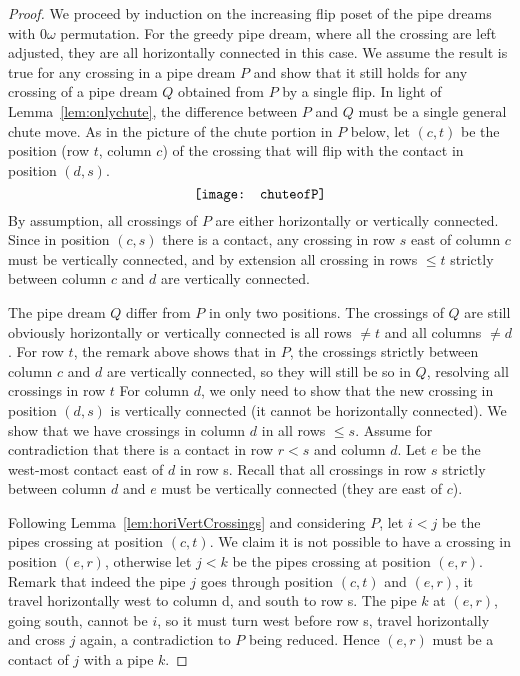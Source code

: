 \begin{proof}
We proceed by induction on the increasing flip poset of the pipe dreams with $0\omega$ permutation. 
For the greedy pipe dream, where all the crossing are left adjusted, they are all horizontally connected in this case.
We assume the result is true for any crossing in a pipe dream $P$ and show that it still holds  for any crossing of a pipe dream  $Q$ obtained from $P$ by a single flip.
In light of Lemma~\ref{lem:onlychute}, the difference between $P$ and $Q$ must be a single general chute move. As in the picture of the chute portion in $P$ below, 
let $(c,t)$ be the position (row $t$, column $c$) of the crossing that will flip with the contact in position $(d,s)$.
$$	\centerline{\texttt{[image: chuteofP]}}  $$
By assumption, all crossings of  $P$ are either horizontally or vertically connected. Since in position $(c,s)$ there is a contact, any crossing in row $s$ east of column $c$ must
be vertically connected, and by extension all crossing in rows $\le t$ strictly between column $c$ and $d$ are vertically connected.

The pipe dream $Q$ differ from $P$ in only two positions. The crossings of $Q$ are still obviously horizontally or vertically connected is all rows $\ne t$ and all columns $\ne d$.
For row $t$, the remark above shows that in $P$, the crossings strictly between column $c$ and $d$ are vertically connected, so they will still be so in $Q$, resolving all crossings in row $t$
For column $d$, we only need to show that the new crossing in position $(d,s)$ is vertically connected (it cannot be horizontally connected).
We show that we have crossings in column $d$ in all rows $\le s$. Assume for contradiction that there is a contact in row $r<s$ and column $d$.
Let $e$ be the west-most contact east of $d$ in row s. Recall that all crossings in row $s$ strictly between column $d$ and $e$ must be vertically connected (they are east of $c$).

Following Lemma~\ref{lem:horiVertCrossings} and considering $P$, let $i<j$ be the pipes crossing at position $(c,t)$. 
We claim it is not possible to have a crossing in position $(e,r)$, otherwise let $j<k$ be the pipes crossing at position $(e,r)$.
Remark that indeed the pipe $j$ goes through position $(c,t)$ and $(e,r)$, it travel  horizontally west to column d, and south to row s. 
The pipe $k$ at $(e,r)$, going south, cannot be $i$, so it must turn west before row s, travel horizontally and cross $j$ again, a contradiction to $P$ being reduced.
Hence $(e,r)$ must be a contact of $j$ with a pipe $k$.


\end{proof}
